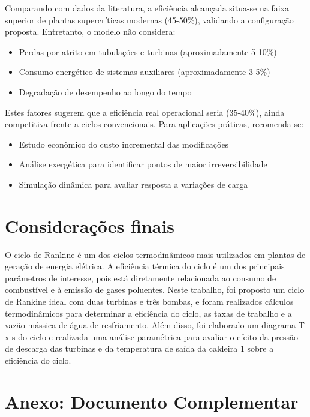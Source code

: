 \documentclass[
	article,			%
	11pt,				%
	oneside,			%
	a4paper,			%
	english,			%
	brazil,				%
	sumario=tradicional
	]{abntex2}
\begin{document}
Comparando com dados da literatura, a eficiência alcançada situa-se na faixa superior de plantas supercríticas modernas (45-50\%), validando a configuração proposta. Entretanto, o modelo não considera:

\begin{itemize}
	\item Perdas por atrito em tubulações e turbinas (aproximadamente 5-10\%)
	\item Consumo energético de sistemas auxiliares (aproximadamente 3-5\%)
	\item Degradação de desempenho ao longo do tempo
\end{itemize}

Estes fatores sugerem que a eficiência real operacional seria (35-40\%), ainda competitiva frente a ciclos convencionais. Para aplicações práticas, recomenda-se:
\begin{itemize}
	\item Estudo econômico do custo incremental das modificações
	\item Análise exergética para identificar pontos de maior irreversibilidade
	\item Simulação dinâmica para avaliar resposta a variações de carga
\end{itemize}

%

\section{Considerações finais}

O ciclo de Rankine é um dos ciclos termodinâmicos mais utilizados em plantas de geração de energia elétrica. A eficiência térmica do ciclo é um dos principais parâmetros de interesse, pois está diretamente relacionada ao consumo de combustível e à emissão de gases poluentes. Neste trabalho, foi proposto um ciclo de Rankine ideal com duas turbinas e três bombas, e foram realizados cálculos termodinâmicos para determinar a eficiência do ciclo, as taxas de trabalho e a vazão mássica de água de resfriamento. Além disso, foi elaborado um diagrama T x s do ciclo e realizada uma análise paramétrica para avaliar o efeito da pressão de descarga das turbinas e da temperatura de saída da caldeira 1 sobre a eficiência do ciclo.


\section{Anexo: Documento Complementar}
\clearpage
\label{anexo:pdf}



\postextual

\clearpage

\end{document}
